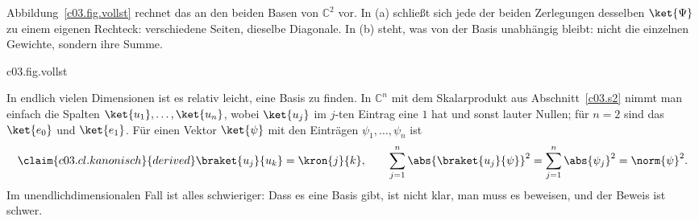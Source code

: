 Abbildung~\ref{c03.fig.vollst} rechnet das an den beiden Basen von $\mathbb{C}^2$ vor. In (a)
schließt sich jede der beiden Zerlegungen desselben $\ket{\Psi}$ zu einem eigenen Rechteck:
verschiedene Seiten, dieselbe Diagonale. In (b) steht, was von der Basis unabhängig bleibt:
nicht die einzelnen Gewichte, sondern ihre Summe.

\begin{tpcfigure}{c03.fig.vollst}
  \caption{Die Vollständigkeitsrelation an einem Vektor in zwei Basen. (a) Der Vektor
    $\ket{\Psi} = (2\ket{e_0} + \ket{e_1})/\sqrt{5}$ aus Beispiel~\ref{c03.ex.zwei-basen}
    (dicker Pfeil) als Summe seiner Komponenten $c_j \ket{\phi_j}$ mit
    $c_j = \braket{\phi_j}{\Psi}$, einmal in der Basis $\ket{e_0}, \ket{e_1}$ (Rechteck
    gestrichelt geschlossen), einmal in der Basis $\ket{e_+}, \ket{e_-}$ (Rechteck gepunktet
    geschlossen). Weil alle Koeffizienten reell sind, liegt alles in der reellen Ebene, die
    $\ket{e_0}$ und $\ket{e_1}$ aufspannen; die Strahlen von $\ket{e_\pm}$ halbieren die Winkel
    zwischen den Achsen. Die beiden Rechtecke haben verschiedene Seiten und dieselbe
    Diagonale. (b) Die Gewichte $\abs{c_j}^2$ als Balkenstücke: $\tfrac45$ und $\tfrac15$
    gegen $\tfrac{9}{10}$ und $\tfrac{1}{10}$. Die Aufteilung hängt von der Basis ab, die Summe
    $\norm{\Psi}^2 = 1$ (gestrichelte Linie) nicht.}
\end{tpcfigure}

In endlich vielen Dimensionen ist es relativ leicht, eine Basis zu finden. In $\mathbb{C}^n$
mit dem Skalarprodukt aus Abschnitt~\ref{c03.s2} nimmt man einfach die Spalten $\ket{u_1}, \dots, \ket{u_n}$, wobei $\ket{u_j}$ im $j$-ten
Eintrag eine $1$ hat und sonst lauter Nullen; für $n = 2$ sind das $\ket{e_0}$ und
$\ket{e_1}$. Für einen Vektor $\ket{\psi}$ mit den Einträgen $\psi_1, \dots, \psi_n$ ist
\begin{equation}\label{c03.eq.kanonisch}\claim{c03.cl.kanonisch}{derived}
  \braket{u_j}{u_k} = \kron{j}{k} ,
  \qquad
  \sum_{j=1}^{n} \abs{\braket{u_j}{\psi}}^2 = \sum_{j=1}^{n} \abs{\psi_j}^2 = \norm{\psi}^2 .
\end{equation}
Im unendlichdimensionalen Fall ist alles schwieriger: Dass es eine Basis gibt, ist nicht klar,
man muss es beweisen, und der Beweis ist schwer.

